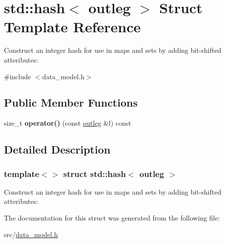\hypertarget{structstd_1_1hash_3_01outleg_01_4}{}\section{std\+:\+:hash$<$ outleg $>$ Struct Template Reference}
\label{structstd_1_1hash_3_01outleg_01_4}


Construct an integer hash for use in maps and sets by adding bit-\/shifted atteributes\+:  




{\ttfamily \#include $<$data\+\_\+model.\+h$>$}

\subsection*{Public Member Functions}
\begin{DoxyCompactItemize}
\item 
\mbox{\label{structstd_1_1hash_3_01outleg_01_4_a0c69a1ac492653f375301e74f897b637}} 
size\+\_\+t {\bfseries operator()} (const \hyperlink{structtricl_1_1outleg}{outleg} \&l) const
\end{DoxyCompactItemize}


\subsection{Detailed Description}
\subsubsection*{template$<$$>$\newline
struct std\+::hash$<$ outleg $>$}

Construct an integer hash for use in maps and sets by adding bit-\/shifted atteributes\+: 

The documentation for this struct was generated from the following file\+:\begin{DoxyCompactItemize}
\item 
src/\hyperlink{data__model_8h}{data\+\_\+model.\+h}\end{DoxyCompactItemize}
